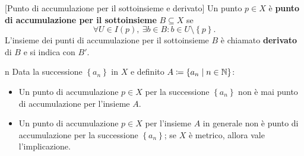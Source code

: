 \begin{definition}{}[Punto di accumulazione per il sottoinsieme e derivato]
	Un punto $p\in X$ è \textbf{punto di accumulazione per il sottoinsieme} $B\subseteq X$ se
	\begin{equation*}
		\forall U\in I\left(p\right),\ \exists b\in B \colon b\in U\setminus \left\{ p\right\}.
	\end{equation*}
L'insieme dei punti di accumulazione per il sottoinsieme $B$ è chiamato \textbf{derivato} di $B$ e si indica con $B'$.
\end{definition}
\begin{exercise}{n}
Data la successione $\left\{a_n\right\}$ in $X$ e definito $A\coloneqq \{a_n\mid n\in\mathbb{N}\}$:
\begin{itemize}
\item Un punto di accumulazione $p\in X$ per la successione $\left\{a_n\right\}$ non è mai punto di accumulazione per l'insieme $A$.
\item Un punto di accumulazione $p\in X$ per l'insieme $A$ in generale non è punto di accumulazione per la successione  $\left\{a_n\right\}$; se $X$ è metrico, allora vale l'implicazione.
\end{itemize}
\end{exercise}
